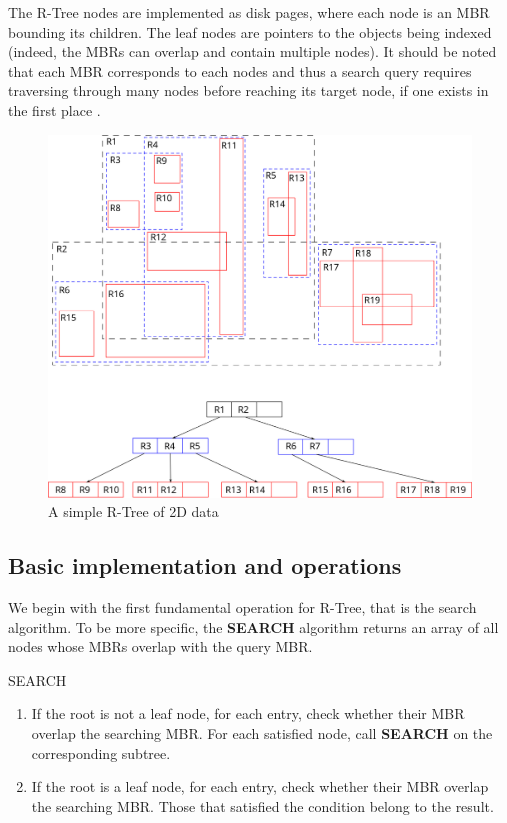 \documentclass{article}
\begin{document}
The R-Tree nodes are implemented as disk pages, where each node is an MBR bounding its children. The leaf nodes are pointers to the objects being indexed (indeed, the MBRs can overlap and contain multiple nodes). It should be noted that each MBR corresponds to each nodes and thus a search query requires traversing through many nodes before reaching its target node, if one exists in the first place \cite{Manolopoulos2006}.

\begin{figure}[ht]
	\includegraphics[width=\textwidth]{pic/2drtree.png}
	\caption{A simple R-Tree of 2D data}
\end{figure}

\subsection{Basic implementation and operations}
We begin with the first fundamental operation for R-Tree, that is the search algorithm. To be more specific, the \textbf{SEARCH} algorithm returns an array of all nodes whose MBRs overlap with the query MBR.
\begin{algorithm}{SEARCH \cite{Guttman1984}}
	\begin{enumerate}
		\item If the root is not a leaf node, for each entry, check whether their MBR overlap the searching MBR. For each satisfied node, call \textbf{SEARCH} on the corresponding subtree.
		\item If the root is a leaf node, for each entry, check whether their MBR overlap the searching MBR. Those that satisfied the condition belong to the result.
	\end{enumerate}
\end{algorithm}
\end{document}
